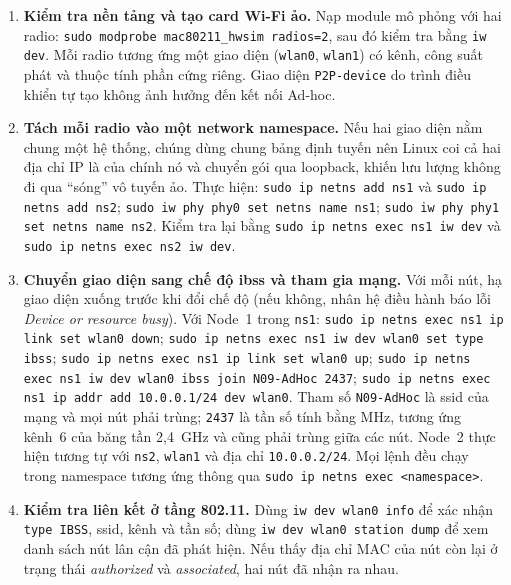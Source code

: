 \begin{enumerate}[leftmargin=*]
  \item \textbf{Kiểm tra nền tảng và tạo card Wi-Fi ảo.} Nạp module mô phỏng với
    hai radio: \texttt{sudo modprobe mac80211\_hwsim radios=2}, sau đó kiểm tra
    bằng \texttt{iw dev}. Mỗi radio tương ứng một giao diện (\texttt{wlan0},
    \texttt{wlan1}) có kênh, công suất phát và thuộc tính phần cứng riêng.
    Giao diện \texttt{P2P-device} do trình điều khiển tự tạo không ảnh hưởng
    đến kết nối Ad-hoc.

  \item \textbf{Tách mỗi radio vào một network namespace.} Nếu hai giao diện nằm
    chung một hệ thống, chúng dùng chung bảng định tuyến nên Linux coi cả hai
    địa chỉ IP là của chính nó và chuyển gói qua loopback, khiến lưu lượng không
    đi qua ``sóng'' vô tuyến ảo. Thực hiện:
    \texttt{sudo ip netns add ns1} và \texttt{sudo ip netns add ns2};
    \texttt{sudo iw phy phy0 set netns name ns1};
    \texttt{sudo iw phy phy1 set netns name ns2}. Kiểm tra lại bằng
    \texttt{sudo ip netns exec ns1 iw dev} và
    \texttt{sudo ip netns exec ns2 iw dev}.

  \item \textbf{Chuyển giao diện sang chế độ \ac{ibss} và tham gia mạng.} Với
    mỗi nút, hạ giao diện xuống trước khi đổi chế độ (nếu không, nhân hệ điều
    hành báo lỗi \emph{Device or resource busy}). Với Node~1 trong \texttt{ns1}:
    \texttt{sudo ip netns exec ns1 ip link set wlan0 down};
    \texttt{sudo ip netns exec ns1 iw dev wlan0 set type ibss};
    \texttt{sudo ip netns exec ns1 ip link set wlan0 up};
    \texttt{sudo ip netns exec ns1 iw dev wlan0 ibss join N09-AdHoc 2437};
    \texttt{sudo ip netns exec ns1 ip addr add 10.0.0.1/24 dev wlan0}. Tham số
    \texttt{N09-AdHoc} là \ac{ssid} của mạng và mọi nút phải trùng;
    \texttt{2437} là tần số tính bằng MHz, tương ứng kênh~6 của băng tần
    2,4~GHz và cũng phải trùng giữa các nút. Node~2 thực hiện tương tự với
    \texttt{ns2}, \texttt{wlan1} và địa chỉ \texttt{10.0.0.2/24}. Mọi lệnh đều
    chạy trong namespace tương ứng thông qua
    \texttt{sudo ip netns exec <namespace>}.

  \item \textbf{Kiểm tra liên kết ở tầng 802.11.} Dùng
    \texttt{iw dev wlan0 info} để xác nhận \texttt{type IBSS}, \ac{ssid},
    kênh và tần số; dùng \texttt{iw dev wlan0 station dump} để xem danh sách nút
    lân cận đã phát hiện. Nếu thấy địa chỉ MAC của nút còn lại ở trạng thái
    \emph{authorized} và \emph{associated}, hai nút đã nhận ra nhau.


\end{enumerate}
